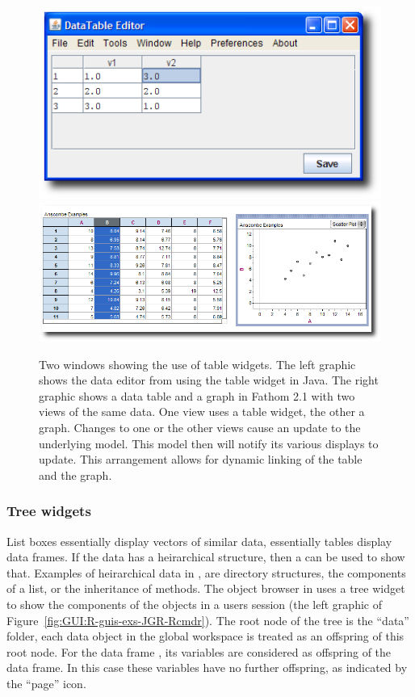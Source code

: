 \begin{figure}
  \centering
  \includegraphics[width=.4\textwidth]{JGR-data-editor}
  \includegraphics[width=.55\textwidth]{fathom-2-1-xyplot}
  \caption{
    Two windows showing the use of table widgets.
    The left graphic shows the data editor from  using the
    table widget in Java.  
    The right graphic shows a data table and a graph in Fathom 2.1
    with two views of the same data. One view uses a table widget, the
    other a graph. Changes to one or the other views cause an update
    to the underlying model. This model then will notify its various
    displays to update. This arrangement allows for dynamic linking of
    the table and the graph.}
  \label{fig:GUI:table-widgets}
\end{figure}

\subsubsection{Tree widgets}
\label{sec:GUI:tree-widgets}

List boxes essentially display vectors of similar data, essentially
tables display data frames. If the data has a heirarchical structure,
then a  can be used to show that. Examples of
heirarchical data in \R, are directory structures, the components of a
list, or the inheritance of methods. The object browser in 
uses a tree widget to show the components of the objects in a users
session (the left graphic of
Figure~\ref{fig:GUI:R-guis-exs-JGR-Rcmdr}). The root node of the tree
is the ``data'' folder, each data object in the global workspace is
treated as an offspring of this root node. For the data frame
, its variables are considered as offspring of the data
frame. In this case these variables have no further offspring, as
indicated by the ``page'' icon.


